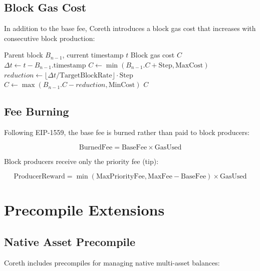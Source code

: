 \documentclass[11pt,letterpaper]{article}
\begin{document}
\subsection{Block Gas Cost}

In addition to the base fee, Coreth introduces a block gas cost that increases with consecutive block production:

\begin{algorithm}
\caption{Block Gas Cost Calculation}
\label{alg:blockgascost}
\begin{algorithmic}[1]
\Require Parent block $B_{n-1}$, current timestamp $t$
\Ensure Block gas cost $C$
\State $\Delta t \gets t - B_{n-1}.\text{timestamp}$
    \State $C \gets \min(B_{n-1}.C + \text{Step}, \text{MaxCost})$
\Else
    \State $reduction \gets \lfloor\Delta t / \text{TargetBlockRate}\rfloor \cdot \text{Step}$
    \State $C \gets \max(B_{n-1}.C - reduction, \text{MinCost})$
\EndIf
\State \Return $C$
\end{algorithmic}
\end{algorithm}

\subsection{Fee Burning}

Following EIP-1559, the base fee is burned rather than paid to block producers:

\begin{equation}
\text{BurnedFee} = \text{BaseFee} \times \text{GasUsed}
\end{equation}

Block producers receive only the priority fee (tip):

\begin{equation}
\text{ProducerReward} = \min(\text{MaxPriorityFee}, \text{MaxFee} - \text{BaseFee}) \times \text{GasUsed}
\end{equation}

\section{Precompile Extensions}

\subsection{Native Asset Precompile}

Coreth includes precompiles for managing native multi-asset balances:
\end{document}
